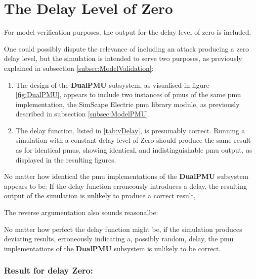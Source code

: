 \section{The Delay Level of Zero}
For model verification purposes, the output for the delay level of zero is included.

One could possibly dispute the relevance of including an attack producing a zero delay level, but the simulation is intended to serve two purposes, as previously explained in subsection \ref{subsec:ModelValidation}:

\begin{enumerate}
\item The design of the \textbf{DualPMU}  subsystem, as visualised in figure \ref{fig:DualPMU}, appears to include two instances of \acrlong{pmu}s of the same \acrshort{pmu} implementation, the SimScape Electric \acrshort{pmu} library module, as previously described in subsection \ref{subsec:ModelPMU}.  
\item The delay function, listed in \ref{tab:vDelay}, is presumably correct. Running a simulation with a constant delay level of Zero should produce the same result as for identical \acrfull{pmu}s, showing identical, and indistinguishable \acrshort{pmu} output, as displayed in the resulting figures.
\end{enumerate}

No matter how identical the \acrshort{pmu} implementations of the  \textbf{DualPMU}  subsystem appears to be: If the delay function erroneously introduces a delay, the resulting output of the simulation is unlikely to produce a correct result, 

The reverse argumentation also sounds reasonalbe:

No matter how perfect the delay function might be, if the simulation produces deviating results, erroneously indicating a, possibly random, delay, the \acrshort{pmu} implementations of the  \textbf{DualPMU}  subsystem  is unlikely to be correct. 

\subsubsection{Result for delay Zero:}

\begin{small}
\end{small}





